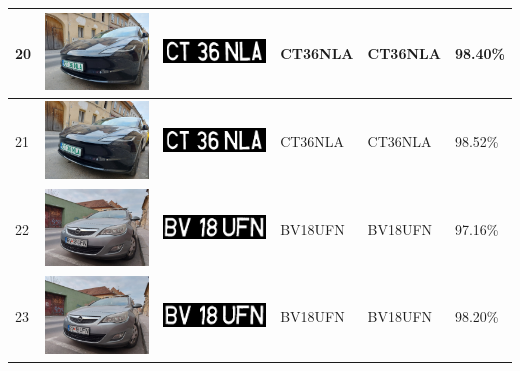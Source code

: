 \documentclass[a4paper,12pt]{report}
\begin{document}
\begin{longtable}{| m{0.6cm} | m{3cm} | m{3cm} | m{1.8cm} | m{1.8cm} | m{1.8cm} |}
    20  & \includegraphics[width=3cm,keepaspectratio]{dataset/10_d2.jpg}  & \includegraphics[width=3cm,keepaspectratio]{segmentari/20.jpg}  & CT36NLA             & CT36NLA              & 98.40\%    \\ \hline
    21  & \includegraphics[width=3cm,keepaspectratio]{dataset/10_d3.jpg}  & \includegraphics[width=3cm,keepaspectratio]{segmentari/21.jpg}  & CT36NLA             & CT36NLA              & 98.52\%    \\ \hline
    22  & \includegraphics[width=3cm,keepaspectratio]{dataset/11_d1.jpg}  & \includegraphics[width=3cm,keepaspectratio]{segmentari/22.jpg}  & BV18UFN             & BV18UFN              & 97.16\%    \\ \hline
    23  & \includegraphics[width=3cm,keepaspectratio]{dataset/11_d2.jpg}  & \includegraphics[width=3cm,keepaspectratio]{segmentari/23.jpg}  & BV18UFN             & BV18UFN              & 98.20\%    \\ \hline

\end{longtable}
\end{document}
